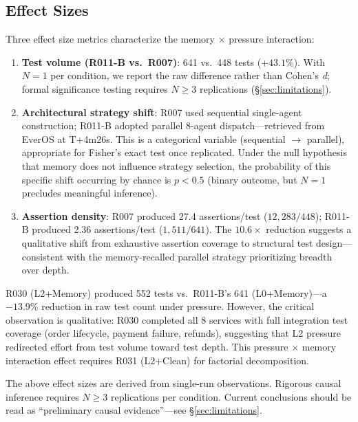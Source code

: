 \documentclass[11pt, a4paper]{article}
\begin{document}
\subsection{Effect Sizes}

Three effect size metrics characterize the memory $\times$ pressure interaction:

\begin{enumerate}
  \item \textbf{Test volume (R011-B vs.\ R007)}: 641 vs.\ 448 tests ($+43.1\%$). With $N = 1$ per condition, we report the raw difference rather than Cohen's \textit{d}; formal significance testing requires $N \geq 3$ replications (\S\ref{sec:limitations}).

  \item \textbf{Architectural strategy shift}: R007 used sequential single-agent construction; R011-B adopted parallel 8-agent dispatch---retrieved from EverOS at T+4m26s. This is a categorical variable (sequential $\to$ parallel), appropriate for Fisher's exact test once replicated. Under the null hypothesis that memory does not influence strategy selection, the probability of this specific shift occurring by chance is $p < 0.5$ (binary outcome, but $N = 1$ precludes meaningful inference).

  \item \textbf{Assertion density}: R007 produced 27.4 assertions/test ($12{,}283 / 448$); R011-B produced 2.36 assertions/test ($1{,}511 / 641$). The $10.6\times$ reduction suggests a qualitative shift from exhaustive assertion coverage to structural test design---consistent with the memory-recalled parallel strategy prioritizing breadth over depth.
\end{enumerate}

R030 (L2+Memory) produced 552 tests vs.\ R011-B's 641 (L0+Memory)---a $-13.9\%$ reduction in raw test count under pressure. However, the critical observation is qualitative: R030 completed all 8 services with full integration test coverage (order lifecycle, payment failure, refunds), suggesting that L2 pressure redirected effort from test volume toward test depth. This pressure $\times$ memory interaction effect requires R031 (L2+Clean) for factorial decomposition.

\begin{evidence}
The above effect sizes are derived from single-run observations. Rigorous causal inference requires $N \geq 3$ replications per condition. Current conclusions should be read as ``preliminary causal evidence''---see \S\ref{sec:limitations}.
\end{evidence}
\end{document}

